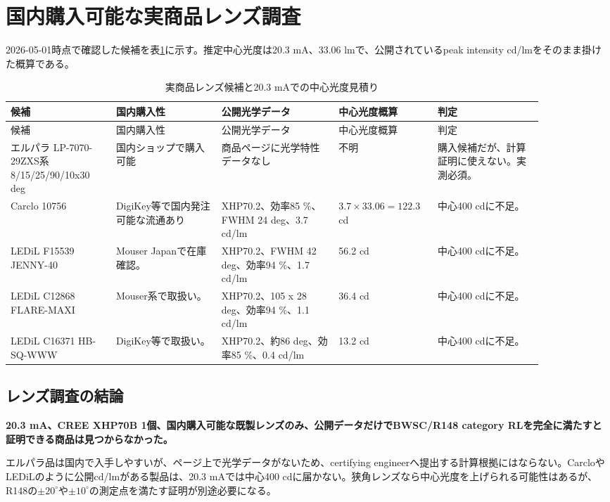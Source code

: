 \documentclass[11pt,a4paper]{article}
\begin{document}
\section{国内購入可能な実商品レンズ調査}
2026-05-01時点で確認した候補を表\ref{tab:lenses}に示す。推定中心光度は20.3 mA、33.06 lmで、公開されているpeak intensity cd/lmをそのまま掛けた概算である。

\begin{longtable}{p{0.18\linewidth}p{0.18\linewidth}p{0.20\linewidth}p{0.14\linewidth}p{0.18\linewidth}}
\caption{実商品レンズ候補と20.3 mAでの中心光度見積り}
\label{tab:lenses}\\
\toprule
候補 & 国内購入性 & 公開光学データ & 中心光度概算 & 判定 \\
\midrule
\endfirsthead
\toprule
候補 & 国内購入性 & 公開光学データ & 中心光度概算 & 判定 \\
\midrule
\endhead
エルパラ LP-7070-29ZXS系 8/15/25/90/10x30 deg & 国内ショップで購入可能 & 商品ページに光学特性データなし & 不明 & 購入候補だが、計算証明に使えない。実測必須。\\
\addlinespace
Carclo 10756 & DigiKey等で国内発注可能な流通あり & XHP70.2、効率85 \%、FWHM 24 deg、3.7 cd/lm & $3.7\times33.06=122.3$ cd & 中心400 cdに不足。\\
\addlinespace
LEDiL F15539 JENNY-40 & Mouser Japanで在庫確認。 & XHP70.2、FWHM 42 deg、効率94 \%、1.7 cd/lm & 56.2 cd & 中心400 cdに不足。\\
\addlinespace
LEDiL C12868 FLARE-MAXI & Mouser系で取扱い。 & XHP70.2、105 x 28 deg、効率94 \%、1.1 cd/lm & 36.4 cd & 中心400 cdに不足。\\
\addlinespace
LEDiL C16371 HB-SQ-WWW & DigiKey等で取扱い。 & XHP70.2、約86 deg、効率85 \%、0.4 cd/lm & 13.2 cd & 中心400 cdに不足。\\
\bottomrule
\end{longtable}

\subsection{レンズ調査の結論}
\textbf{20.3 mA、CREE XHP70B 1個、国内購入可能な既製レンズのみ、公開データだけでBWSC/R148 category RLを完全に満たすと証明できる商品は見つからなかった。}

エルパラ品は国内で入手しやすいが、ページ上で光学データがないため、certifying engineerへ提出する計算根拠にはならない。CarcloやLEDiLのように公開cd/lmがある製品は、20.3 mAでは中心400 cdに届かない。狭角レンズなら中心光度を上げられる可能性はあるが、R148の$\pm20^\circ$や$\pm10^\circ$の測定点を満たす証明が別途必要になる。
\end{document}
